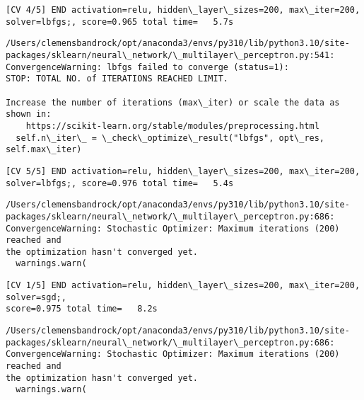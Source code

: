 \documentclass[11pt]{article}
\begin{document}
    \begin{Verbatim}[commandchars=\\\{\}]
[CV 4/5] END activation=relu, hidden\_layer\_sizes=200, max\_iter=200,
solver=lbfgs;, score=0.965 total time=   5.7s
    \end{Verbatim}

    \begin{Verbatim}[commandchars=\\\{\}]
/Users/clemensbandrock/opt/anaconda3/envs/py310/lib/python3.10/site-
packages/sklearn/neural\_network/\_multilayer\_perceptron.py:541:
ConvergenceWarning: lbfgs failed to converge (status=1):
STOP: TOTAL NO. of ITERATIONS REACHED LIMIT.

Increase the number of iterations (max\_iter) or scale the data as shown in:
    https://scikit-learn.org/stable/modules/preprocessing.html
  self.n\_iter\_ = \_check\_optimize\_result("lbfgs", opt\_res, self.max\_iter)
    \end{Verbatim}

    \begin{Verbatim}[commandchars=\\\{\}]
[CV 5/5] END activation=relu, hidden\_layer\_sizes=200, max\_iter=200,
solver=lbfgs;, score=0.976 total time=   5.4s
    \end{Verbatim}

    \begin{Verbatim}[commandchars=\\\{\}]
/Users/clemensbandrock/opt/anaconda3/envs/py310/lib/python3.10/site-
packages/sklearn/neural\_network/\_multilayer\_perceptron.py:686:
ConvergenceWarning: Stochastic Optimizer: Maximum iterations (200) reached and
the optimization hasn't converged yet.
  warnings.warn(
    \end{Verbatim}

    \begin{Verbatim}[commandchars=\\\{\}]
[CV 1/5] END activation=relu, hidden\_layer\_sizes=200, max\_iter=200, solver=sgd;,
score=0.975 total time=   8.2s
    \end{Verbatim}

    \begin{Verbatim}[commandchars=\\\{\}]
/Users/clemensbandrock/opt/anaconda3/envs/py310/lib/python3.10/site-
packages/sklearn/neural\_network/\_multilayer\_perceptron.py:686:
ConvergenceWarning: Stochastic Optimizer: Maximum iterations (200) reached and
the optimization hasn't converged yet.
  warnings.warn(
    \end{Verbatim}
\end{document}
